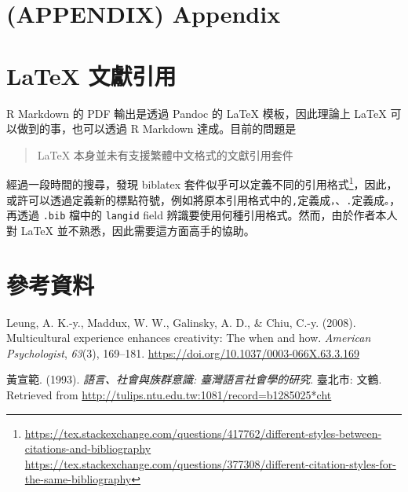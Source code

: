 \documentclass[oneside]{book}
\let\oldhref=\href
\renewcommand{\href}[2]{#2\footnote{\url{#1}}}
\theoremstyle{definition}
\theoremstyle{definition}
\theoremstyle{definition}
\theoremstyle{remark}
\begin{document}
\chapter{(APPENDIX) Appendix}\label{appendix-appendix}

\chapter{LaTeX 文獻引用}\label{latex-cite-pkg}

R Markdown 的 PDF 輸出是透過 Pandoc 的 LaTeX 模板，因此理論上 LaTeX
可以做到的事，也可以透過 R Markdown 達成。目前的問題是

\begin{quote}
LaTeX 本身並未有支援繁體中文格式的文獻引用套件
\end{quote}

經過一段時間的搜尋，發現 biblatex
套件似乎可以定義不同的引用格式\footnote{\url{https://tex.stackexchange.com/questions/417762/different-styles-between-citations-and-bibliography}\\
  \url{https://tex.stackexchange.com/questions/377308/different-citation-styles-for-the-same-bibliography}}，因此，或許可以透過定義新的標點符號，例如將原本引用格式中的\texttt{,}定義成\texttt{，}、\texttt{.}定義成\texttt{。}，再透過
\texttt{.bib} 檔中的 \texttt{langid} field
辨識要使用何種引用格式。然而，由於作者本人對 LaTeX
並不熟悉，因此需要這方面高手的協助。

\renewcommand{\href}{\oldhref}

\chapter*{參考資料}\label{references}

\hypertarget{refs}{}
\hypertarget{ref-leung2008}{}
Leung, A. K.-y., Maddux, W. W., Galinsky, A. D., \& Chiu, C.-y. (2008).
Multicultural experience enhances creativity: The when and how.
\emph{American Psychologist}, \emph{63}(3), 169--181.
\url{https://doi.org/10.1037/0003-066X.63.3.169}

\hypertarget{ref-huangxuanfan1993}{}
黃宣範. (1993). \emph{語言、社會與族群意識: 臺灣語言社會學的研究}.
臺北市: 文鶴. Retrieved from
\url{http://tulips.ntu.edu.tw:1081/record=b1285025*cht}
\end{document}

